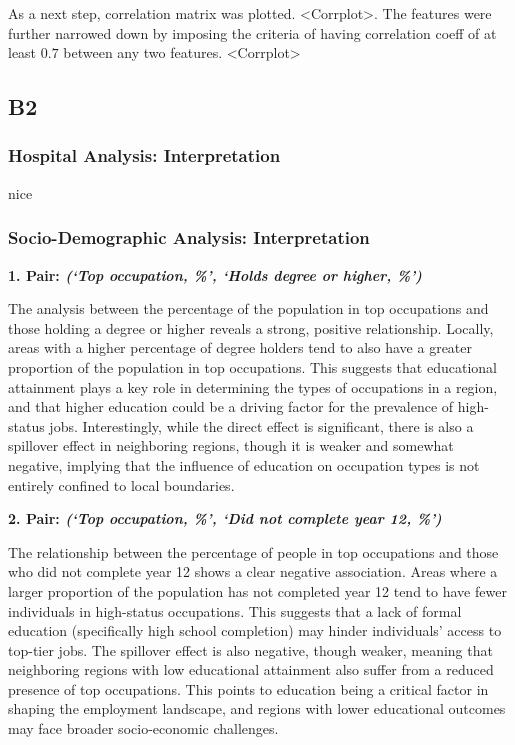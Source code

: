 \documentclass[
	a4paper, %
	10pt, %
	unnumberedsections, %
	twoside, %
]{LTJournalArticle}
\begin{document}
As a next step, correlation matrix was plotted. <Corrplot>. The features were further narrowed down by imposing the criteria of having correlation coeff of at least $0.7$ between any two features. <Corrplot>


\subsection{B2}

\subsubsection{Hospital Analysis: Interpretation}

nice

\subsubsection{Socio-Demographic Analysis: Interpretation}\leavevmode

\textbf{1. Pair: \textit{(‘Top occupation, \%’, ‘Holds degree or higher, \%’)}} 

The analysis between the percentage of the population in top occupations and those holding a degree or higher reveals a strong, positive relationship. Locally, areas with a higher percentage of degree holders tend to also have a greater proportion of the population in top occupations. This suggests that educational attainment plays a key role in determining the types of occupations in a region, and that higher education could be a driving factor for the prevalence of high-status jobs. Interestingly, while the direct effect is significant, there is also a spillover effect in neighboring regions, though it is weaker and somewhat negative, implying that the influence of education on occupation types is not entirely confined to local boundaries.

\textbf{2. Pair: \textit{(‘Top occupation, \%’, ‘Did not complete year 12, \%’)}} 

The relationship between the percentage of people in top occupations and those who did not complete year 12 shows a clear negative association. Areas where a larger proportion of the population has not completed year 12 tend to have fewer individuals in high-status occupations. This suggests that a lack of formal education (specifically high school completion) may hinder individuals’ access to top-tier jobs. The spillover effect is also negative, though weaker, meaning that neighboring regions with low educational attainment also suffer from a reduced presence of top occupations. This points to education being a critical factor in shaping the employment landscape, and regions with lower educational outcomes may face broader socio-economic challenges.
\end{document}
